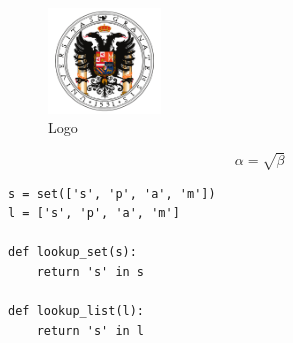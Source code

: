 \begin{figure}[H]
    \centering
    \includegraphics[width=3cm]{images/university_logo.png}
    \caption{Logo}
    \label{logo}
\end{figure}

\begin{equation}
    \label{simple_equation}
    \alpha = \sqrt{ \beta }
\end{equation}

\begin{verbatim}
s = set(['s', 'p', 'a', 'm'])
l = ['s', 'p', 'a', 'm']

def lookup_set(s):
    return 's' in s

def lookup_list(l):
    return 's' in l
\end{verbatim}
